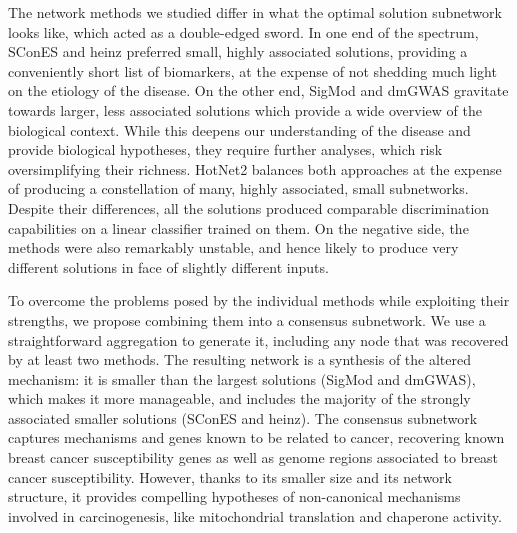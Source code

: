 \documentclass[twocolumn, 11pt, draft]{article}
\begin{document}
The network methods we studied differ in what the optimal solution subnetwork looks like, which acted as a double-edged sword. In one end of the spectrum, SConES and heinz preferred small, highly associated solutions, providing a conveniently short list of biomarkers, at the expense of not shedding much light on the etiology of the disease. On the other end, SigMod and dmGWAS gravitate towards larger, less associated solutions which provide a wide overview of the biological context. While this deepens our understanding of the disease and provide biological hypotheses, they require further analyses, which risk oversimplifying their richness. HotNet2 balances both approaches at the expense of producing a constellation of many, highly associated, small subnetworks. Despite their differences, all the solutions produced comparable discrimination capabilities on a linear classifier trained on them. On the negative side, the methods were also remarkably unstable, and hence likely to produce very different solutions in face of slightly different inputs.

To overcome the problems posed by the individual methods while exploiting their strengths, we propose combining them into a consensus subnetwork. We use a straightforward aggregation to generate it, including any node that was recovered by at least two methods. The resulting network is a synthesis of the altered mechanism: it is smaller than the largest solutions (SigMod and dmGWAS), which makes it more manageable, and includes the majority of the strongly associated smaller solutions (SConES and heinz). The consensus subnetwork captures mechanisms and genes known to be related to cancer, recovering known breast cancer susceptibility genes as well as genome regions associated to breast cancer susceptibility. However, thanks to its smaller size and its network structure, it provides compelling hypotheses of non-canonical mechanisms involved in carcinogenesis, like mitochondrial translation and chaperone activity.
\end{document}
